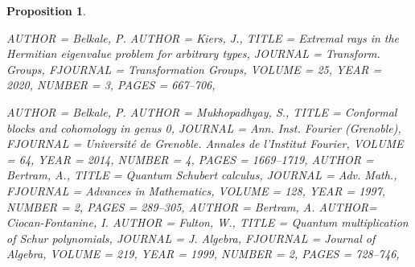 \documentclass[11pt]{amsart}
\newtheorem{proposition}[theorem]{Proposition}
\numberwithin{theorem}{subsection}
\begin{document}
{\begin{proposition}
\begin{bibdiv}
\begin{biblist}
 {
    AUTHOR = {Belkale, P. }
    AUTHOR = {Kiers, J.},
     TITLE = {Extremal rays in the {H}ermitian eigenvalue problem for
              arbitrary types},
   JOURNAL = {Transform. Groups},
  FJOURNAL = {Transformation Groups},
    VOLUME = {25},
      YEAR = {2020},
    NUMBER = {3},
     PAGES = {667--706},
}

 {
    AUTHOR = {Belkale, P.}
    AUTHOR = {Mukhopadhyay, S.},
     TITLE = {Conformal blocks and cohomology in genus 0},
   JOURNAL = {Ann. Inst. Fourier (Grenoble)},
  FJOURNAL = {Universit\'{e} de Grenoble. Annales de l'Institut Fourier},
    VOLUME = {64},
      YEAR = {2014},
    NUMBER = {4},
     PAGES = {1669--1719},
}
 {
    AUTHOR = {Bertram, A.},
     TITLE = {Quantum {S}chubert calculus},
   JOURNAL = {Adv. Math.},
  FJOURNAL = {Advances in Mathematics},
    VOLUME = {128},
      YEAR = {1997},
    NUMBER = {2},
     PAGES = {289--305},
}
 {
    AUTHOR = {Bertram, A.}
    AUTHOR=  {Ciocan-Fontanine, I.}
    AUTHOR = {Fulton,
              W.},
     TITLE = {Quantum multiplication of {S}chur polynomials},
   JOURNAL = {J. Algebra},
  FJOURNAL = {Journal of Algebra},
    VOLUME = {219},
      YEAR = {1999},
    NUMBER = {2},
     PAGES = {728--746},
}
	



\end{biblist}
\end{bibdiv}
\end{proposition}}
\end{document}
